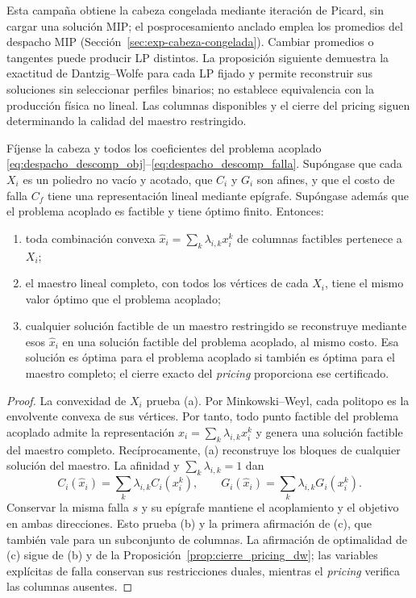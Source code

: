 Esta campaña obtiene la cabeza congelada mediante iteración de Picard, sin cargar una solución MIP; el posprocesamiento anclado emplea los promedios del despacho MIP (Sección~\ref{sec:exp-cabeza-congelada}). Cambiar promedios o tangentes puede producir LP distintos. La proposición siguiente demuestra la exactitud de Dantzig--Wolfe para cada LP fijado y permite reconstruir sus soluciones sin seleccionar perfiles binarios; no establece equivalencia con la producción física no lineal. Las columnas disponibles y el cierre del pricing siguen determinando la calidad del maestro restringido.

\begin{proposicion}
\label{prop:dw_exacto_lineal}
Fíjense la cabeza y todos los coeficientes del problema acoplado
\eqref{eq:despacho_descomp_obj}--\eqref{eq:despacho_descomp_falla}.
Supóngase que cada $X_i$ es un poliedro no vacío y acotado, que $C_i$ y $G_i$ son afines,
y que el costo de falla $C_f$ tiene una representación lineal mediante epígrafe.
Supóngase además que el problema acoplado es factible y tiene óptimo finito. Entonces:
\begin{enumerate}
 \item[\textnormal{(a)}] toda combinación convexa $\hat x_i=\sum_k\lambda_{i,k}x_i^k$
 de columnas factibles pertenece a $X_i$;
 \item[\textnormal{(b)}] el maestro lineal completo, con todos los vértices de cada $X_i$,
 tiene el mismo valor óptimo que el problema acoplado;
 \item[\textnormal{(c)}] cualquier solución factible de un maestro restringido se reconstruye
 mediante esos $\hat x_i$ en una solución factible del problema acoplado, al mismo costo.
 Esa solución es óptima para el problema acoplado si también es óptima para el maestro
 completo; el cierre exacto del \emph{pricing} proporciona ese certificado.
\end{enumerate}
\end{proposicion}
\begin{proof}
La convexidad de $X_i$ prueba (a). Por Minkowski--Weyl, cada politopo es la envolvente
convexa de sus vértices. Por tanto, todo punto factible del problema acoplado admite la
representación $x_i=\sum_k\lambda_{i,k}x_i^k$ y genera una solución factible del maestro
completo. Recíprocamente, (a) reconstruye los bloques de cualquier solución del maestro.
La afinidad y $\sum_k\lambda_{i,k}=1$ dan
\[
 C_i(\hat x_i)=\sum_k\lambda_{i,k}C_i(x_i^k),\qquad
 G_i(\hat x_i)=\sum_k\lambda_{i,k}G_i(x_i^k).
\]
Conservar la misma falla $s$ y su epígrafe mantiene el acoplamiento y el objetivo en
ambas direcciones. Esto prueba (b) y la primera afirmación de (c), que también vale
para un subconjunto de columnas. La afirmación de optimalidad de (c) sigue de (b) y de
la Proposición~\ref{prop:cierre_pricing_dw}; las variables explícitas de falla conservan
sus restricciones duales, mientras el \emph{pricing} verifica las columnas ausentes.
\end{proof}

